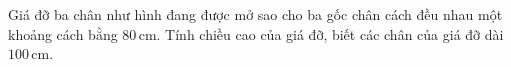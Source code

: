 \begin{ex}
	Giá đỡ ba chân như hình đang được mở sao cho ba gốc chân cách đều nhau một khoảng cách bằng $80$\,cm. Tính chiều cao của giá đỡ, biết các chân của giá đỡ dài $100$\,cm.
\end{ex}

